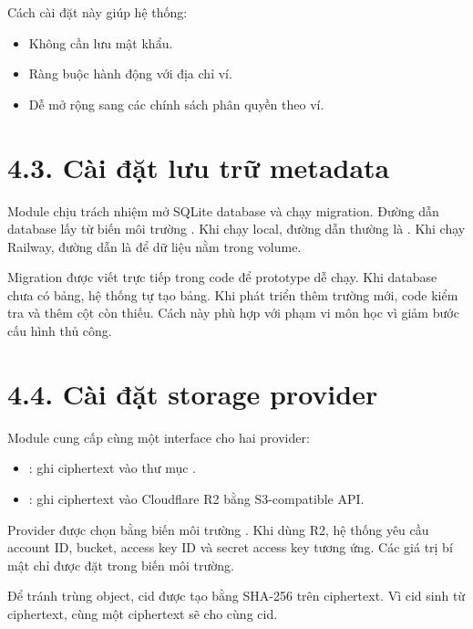 Cách cài đặt này giúp hệ thống:

\begin{itemize}
  \item Không cần lưu mật khẩu.
  \item Ràng buộc hành động với địa chỉ ví.
  \item Dễ mở rộng sang các chính sách phân quyền theo ví.
\end{itemize}

\section*{4.3. Cài đặt lưu trữ metadata}
{}

Module  chịu trách nhiệm mở SQLite database và chạy migration. Đường dẫn database lấy từ biến môi trường . Khi chạy local, đường dẫn thường là . Khi chạy Railway, đường dẫn là  để dữ liệu nằm trong volume.

Migration được viết trực tiếp trong code để prototype dễ chạy. Khi database chưa có bảng, hệ thống tự tạo bảng. Khi phát triển thêm trường mới, code kiểm tra  và thêm cột còn thiếu. Cách này phù hợp với phạm vi môn học vì giảm bước cấu hình thủ công.

\section*{4.4. Cài đặt storage provider}
{}

Module  cung cấp cùng một interface cho hai provider:

\begin{itemize}
  \item {}: ghi ciphertext vào thư mục .
  \item {}: ghi ciphertext vào Cloudflare R2 bằng S3-compatible API.
\end{itemize}

Provider được chọn bằng biến môi trường . Khi dùng R2, hệ thống yêu cầu account ID, bucket, access key ID và secret access key tương ứng. Các giá trị bí mật chỉ được đặt trong biến môi trường.

Để tránh trùng object, cid được tạo bằng SHA-256 trên ciphertext. Vì cid sinh từ ciphertext, cùng một ciphertext sẽ cho cùng cid.

